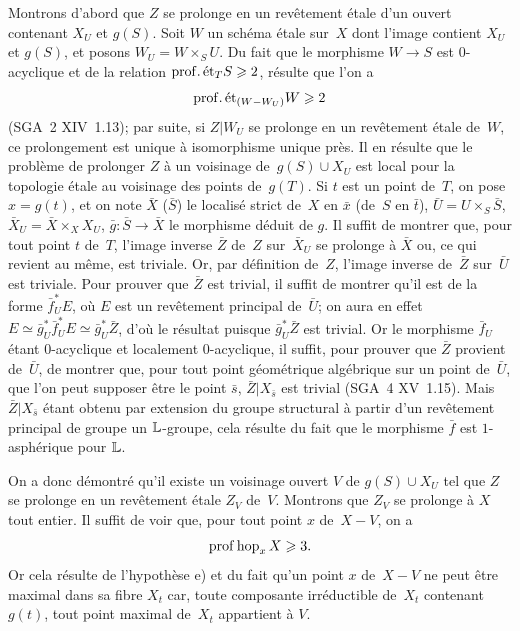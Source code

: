 Montrons d'abord que $Z$ se prolonge en un rev\^etement \'etale
d'un ouvert contenant $X_U$ et $g(S)$. Soit $W$ un sch\'ema
\'etale sur~$X$ dont l'image contient $X_U$ et $g(S)$, et posons
$W_U=W\times_S U$. Du fait que le morphisme $W\to S$ est $0$-acyclique
et de la relation $\mathrm{prof}.\,\mathrm{\acute{e}t}_T S\geqslant 2$, r\'esulte que l'on a
$$
\mathrm{prof}.\,\mathrm{\acute{e}t}_{(W-W_U)} W\geqslant 2
$$
(SGA~2 XIV~1.13); par suite, si $Z|W_U$ se prolonge en un
rev\^etement \'etale de~$W$, ce prolongement est unique \`a
isomorphisme unique pr\`es. Il en r\'esulte que le probl\`eme de
prolonger $Z$ \`a un voisinage de~$g(S)\cup X_U$ est local pour la
topologie \'etale au voisinage des points de~$g(T)$. Si $t$ est un
point de~$T$, on pose $x=g(t)$, et on note $\bar{X}$ (\resp $\bar{S}$)
le localis\'e strict de~$X$ en $\bar{x}$ (\resp de~$S$ en
$\bar{t}$), $\bar{U}=U\times_S \bar{S}$, $\bar{X}_U=\bar{X}\times_X
X_U$, $\bar{g}\colon\bar{S}\to\bar{X}$ le morphisme d\'eduit de
$g$. Il suffit de montrer que, pour tout point $t$ de~$T$, l'image
inverse $\bar{Z}$ de~$Z$ sur~$\bar{X}_U$ se prolonge \`a $\bar{X}$
ou, ce qui revient au m\^eme, est triviale. Or, par d\'efinition
de~$Z$, l'image inverse de~$\bar{Z}$ sur~$\bar{U}$ est
triviale. Pour prouver que $\bar{Z}$ est trivial, il suffit de montrer
qu'il est de la forme $\bar{f}^*_U E$, o\`u $E$ est un
rev\^etement principal de~$\bar{U}$; on aura en effet
$E\simeq\bar{g}^*_U\bar{f}^*_U E \simeq\bar{g}^*_U\bar{Z}$, d'o\`u
le r\'esultat puisque $\bar{g}^*_U\bar{Z}$ est trivial. Or le
morphisme $\bar{f}_U$ \'etant $0$-acyclique et localement $0$-acyclique,
il suffit, pour prouver que $\bar{Z}$ provient de~$\bar{U}$, de
montrer que, pour tout point g\'eom\'etrique alg\'ebrique sur un
point de~$\bar{U}$, que l'on peut supposer \^etre le point
$\bar{s}$, $\bar{Z}|X_{\bar{s}}$ est trivial (SGA~4 XV~1.15). Mais
$\bar{Z}|X_{\bar{s}}$ \'etant obtenu par extension du groupe
structural \`a partir d'un rev\^etement principal de groupe un
$\mathbb{L}$-groupe, cela r\'esulte du fait que le morphisme $\bar{f}$ est
$1$-asph\'erique pour $\mathbb{L}$.

On
a donc d\'emontr\'e qu'il existe un voisinage ouvert $V$ de
$g(S)\cup X_U$ tel que $Z$ se prolonge en un rev\^etement \'etale
$Z_V$ de~$V$. Montrons que $Z_V$ se prolonge \`a $X$ tout entier.
Il suffit de voir que, pour tout point $x$ de~$X-V$, on a
$$
\operatorname{prof}\operatorname{hop}_x X\geqslant 3.
$$
Or cela r\'esulte de l'hypoth\`ese e) et du fait qu'un point $x$
de~$X-V$ ne peut \^etre maximal dans sa fibre $X_t$ car, toute
composante irr\'eductible de~$X_t$ contenant $g(t)$, tout point
maximal de~$X_t$ appartient \`a $V$.

